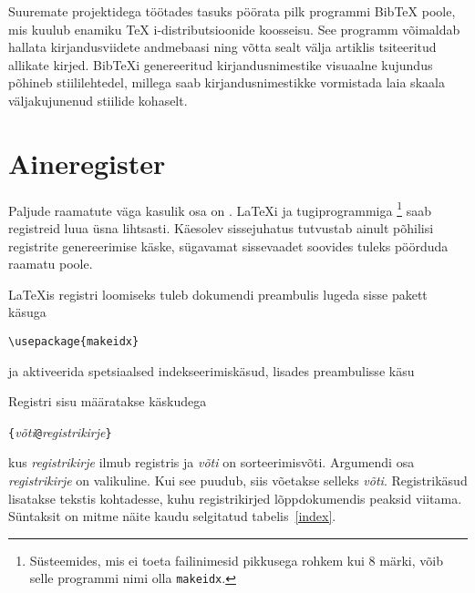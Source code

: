 Suuremate projektidega töötades tasuks pöörata pilk programmi
Bib\TeX{} poole, mis kuulub enamiku \TeX
i-distributsioonide koosseisu. See programm võimaldab hallata
kirjandusviidete andmebaasi ning võtta sealt välja artiklis tsiteeritud
allikate kirjed. Bib\TeX i genereeritud kirjandusnimestike visuaalne
kujundus põhineb stiililehtedel, millega saab kirjandusnimestikke
vormistada laia skaala väljakujunenud stiilide kohaselt.

\section{Aineregister} \label{sec:indexing}

Paljude raamatute väga kasulik osa on . \LaTeX i ja
tugiprogrammiga \footnote{Süsteemides, mis ei toeta
failinimesid pikkusega rohkem kui 8 märki, võib selle programmi nimi
olla \texttt{makeidx}.} saab registreid luua üsna
lihtsasti. Käesolev sissejuhatus tutvustab ainult põhilisi registrite
genereerimise käske, sügavamat sissevaadet soovides tuleks pöörduda
raamatu \companion{} poole.

\LaTeX is registri loomiseks tuleb dokumendi preambulis lugeda sisse
pakett  käsuga
\begin{lscommand}
\verb|\usepackage{makeidx}|
\end{lscommand}
\noindent ja aktiveerida spetsiaalsed indekseerimiskäsud, lisades
preambulisse käsu
\begin{lscommand}
\end{lscommand}
\noindent Registri sisu määratakse käskudega
\begin{lscommand}
  \verb|{|\emph{võti}\verb|@|\emph{registrikirje}\verb|}|
\end{lscommand}
\noindent kus \emph{registrikirje} ilmub registris ja \emph{võti} on
sorteerimisvõti. Argumendi osa \emph{registrikirje} on valikuline. Kui
see puudub, siis võetakse selleks \emph{võti}. Registrikäsud lisatakse
tekstis kohtadesse, kuhu registrikirjed lõppdokumendis peaksid viitama.
Süntaksit on mitme näite kaudu selgitatud tabelis~\ref{index}.

